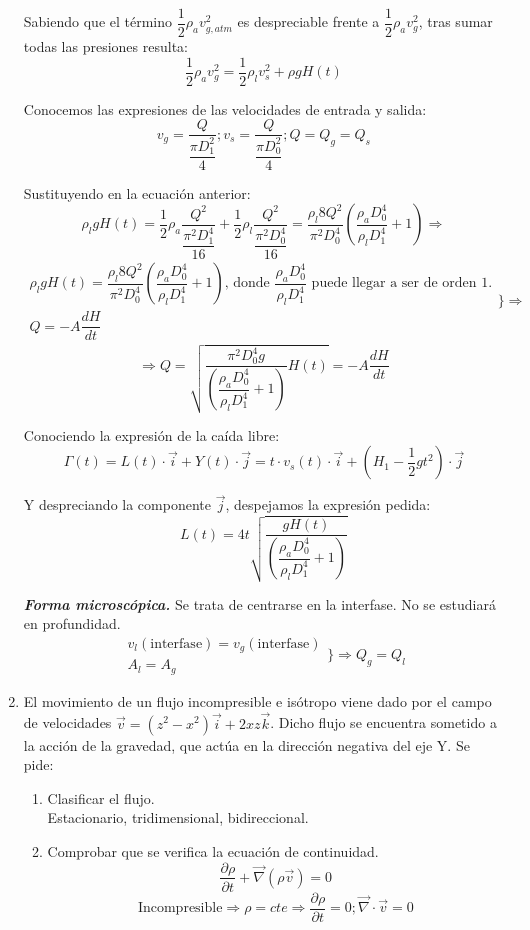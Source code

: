 \begin{enumerate}
Sabiendo que el término $\dfrac{1}{2}\rho_a v_{g,atm}^2$ es despreciable frente a $\dfrac{1}{2}\rho_a v_{g}^2$, tras sumar todas las presiones resulta:
\[\dfrac{1}{2}\rho_a v_{g}^2 = \dfrac{1}{2}\rho_l v_{s}^2 + \rho g H(t)\]

Conocemos las expresiones de las velocidades de entrada y salida:
\[v_g = \dfrac{Q}{\dfrac{\pi D_1^2}{4}}; v_s = \dfrac{Q}{\dfrac{\pi D_0^2}{4}}; Q = Q_g = Q_s\]

Sustituyendo en la ecuación anterior:
\[\rho_l g H(t) = \dfrac{1}{2} \rho_a \dfrac{Q^2}{\dfrac{\pi^2 D_1^4}{16}} + \dfrac{1}{2}\rho_l \dfrac{Q^2}{\dfrac{\pi^2 D_0^4}{16}} =
\dfrac{\rho_l 8 Q^2}{\pi^2 D_0^4}\left(\dfrac{\rho_a D_0^4}{\rho_l D_1^4} + 1\right) \Rightarrow\]
\[
	\begin{matrix}
		\rho_l g H(t)=\dfrac{\rho_l 8 Q^2}{\pi^2 D_0^4}\left(\dfrac{\rho_a D_0^4}{\rho_l D_1^4} + 1\right)\text{, donde }\dfrac{\rho_a D_0^4}{\rho_l D_1^4}\text{ puede llegar a ser de orden 1.}\\
		Q=-A\dfrac{dH}{dt}
	\end{matrix}
	\Biggr\} \Rightarrow\]
\[\Rightarrow Q = \sqrt{\dfrac{\pi^2 D_0^4 g}{\left(\dfrac{\rho_a D_0^4}{\rho_l D_1^4} + 1\right)} H(t)} = -A\dfrac{dH}{dt}\]

Conociendo la expresión de la caída libre:
\[\Gamma(t) = L(t)\cdot\vec{i} + Y(t)\cdot\vec{j} = t\cdot v_s(t) \cdot\vec{i} + (H_1 -\dfrac{1}{2}gt^2 )\cdot\vec{j}\]

Y despreciando la componente $\vec{j}$, despejamos la expresión pedida:
\[L(t) = 4t
\sqrt
{
	\dfrac
	{gH(t)}
	{
		\left(
		\dfrac
			{\rho_a D_0^4}
			{\rho_l D_1^4}
	 	+ 1
		\right)
	}
}
\]

\textit{\textbf{Forma microscópica.}}
	Se trata de centrarse en la interfase. No se estudiará en profundidad.
	\[\begin{matrix}
		v_l(\text{interfase}) = v_g(\text{interfase})\\
		A_l = A_g
	\end{matrix}
	\Biggr\} \Rightarrow Q_g = Q_l
	\]
	

\black
\item El movimiento de un flujo incompresible e isótropo viene dado por el campo de velocidades
$\vec{v} = (z^2 - x^2) \vec{i} + 2xz\vec{k}$. Dicho flujo se encuentra sometido a la acción de la gravedad, que actúa en la dirección negativa del eje Y. Se pide:
\begin{enumerate}
	\item Clasificar el flujo.\\
	\blue Estacionario, tridimensional, bidireccional.\\
	\black
	\item Comprobar que se verifica la ecuación de continuidad.\\
	\blue
		\[\dfrac{\partial \rho}{\partial t} + \vec{\nabla}(\rho \vec{v}) = 0\]
		\[\text{Incompresible}\Rightarrow \rho = cte \Rightarrow \dfrac{\partial \rho}{\partial t} = 0; \vec{\nabla} \cdot \vec{v} = 0\]
		

\end{enumerate}
\end{enumerate}

